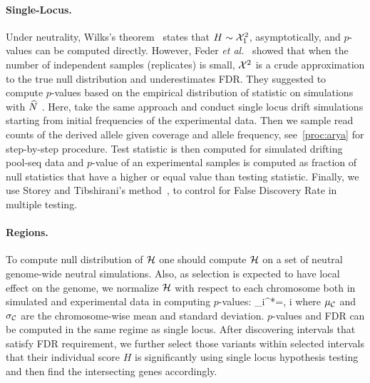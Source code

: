 \paragraph{Single-Locus.}
Under neutrality, Wilks’s theorem~\cite{williams2001weighing} states that 
$H\sim{\cal X}^2_1$, asymptotically, and $p$-values can be computed directly.
However, Feder \emph{et
	al.}~\cite{feder2014Identifying} showed that when the
number of independent samples (replicates) is small, ${\cal X}^2$ is a crude 
approximation to the true null distribution and underestimates FDR. They 
suggested to compute $p$-values based on the empirical
distribution of statistic on simulations with $\widehat{N}$ . Here, take the same 
approach and conduct single 
locus drift simulations starting from 
initial frequencies of the experimental data. Then we sample read counts of the 
derived allele given coverage and allele frequency, see~\ref{proc:arya} for 
step-by-step procedure. 
Test 
statistic is then computed for simulated drifting pool-seq data and $p$-value 
of an 
experimental samples is computed as fraction of null statistics that have a 
higher or equal value than testing statistic.
Finally, we use Storey and 
Tibshirani's method~\cite{storey2003statistical}, to control for False 
Discovery 
Rate in multiple testing.


\paragraph{Regions.}
To compute null distribution of ${\cal H}$ one should compute ${\cal H}$ on a set of 
neutral genome-wide neutral simulations. Also, as selection is expected to have 
local effect on the genome, we normalize ${\cal H}$ with respect to each chromosome 
both in simulated and experimental data in computing $p$-values:
\beq
\Hc_i^*=, \hspace{0.5in} \forall i \in 
  \Cc
\eeq
where $\mu_{\cal C}$ and $\sigma_{\cal C}$ are the chromosome-wise mean and standard 
deviation. $p$-values and FDR can be computed in the same regime as single 
locus. 
After discovering intervals that satisfy FDR requirement, we further select 
those variants within selected intervals that their individual score $H$ is 
significantly using single locus hypothesis testing and then find the 
intersecting genes accordingly.


